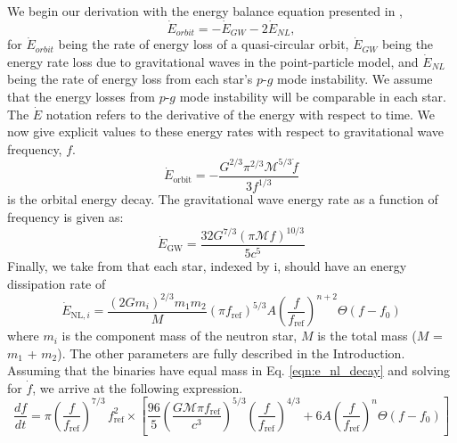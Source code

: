 We begin our derivation with the energy balance equation presented in \cite{Essick:2016tkn},
\begin{equation}\label{eqn_app:energy_bal}
\dot{E}_{orbit} = -\dot{E}_{GW} - 2 \dot{E}_{NL},
\end{equation}
for $\dot{E}_{orbit}$ being the rate of energy loss of a quasi-circular orbit, $\dot{E}_{GW}$ being the energy rate loss due to gravitational waves in the point-particle model, and $\dot{E}_{NL}$ being the rate of energy loss from each star's $p$-$g$ mode instability. We assume that the energy losses from $p$-$g$ mode instability will be comparable in each star. The $\dot{E}$ notation refers to the derivative of the energy with respect to time. We now give explicit values to these energy rates with respect to gravitational wave frequency, $f$.
\begin{equation}\label{eqn:e_orbit_decay}
\dot{E}_{\mathrm{orbit}} = - \frac{G^{2/3} \pi^{2/3} \mathcal{M}^{5/3} \dot{f}}{3 f^{1/3}}
\end{equation}
is the orbital energy decay. The gravitational wave energy rate as a function of frequency is given as:
\begin{equation}\label{eqn:e_gw_decay}
\dot{E}_{\mathrm{GW}} = \frac{32 G^{7/3} \left(\pi \mathcal{M} f\right)^{10/3}}{5 c^5}
\end{equation}
Finally, we take from \cite{Essick:2016tkn} that each star, indexed by i, should have an energy dissipation rate of
\begin{equation}\label{eqn:e_nl_decay}
\dot{E}_{\mathrm{NL}, i} = \frac{(2G m_i)^{2/3}m_1 m_2}{M} (\pi f_{\mathrm{ref}})^{5/3} A \left (\frac{f}{f_{\mathrm{ref}}} \right )^{n+2} \Theta(f - f_0) 
\end{equation}
where $m_i$ is the component mass of the neutron star, $M$ is the total mass ($M$ = $m_1$ + $m_2$). The other parameters are fully described in the Introduction. Assuming that the binaries have equal mass in Eq. \ref{eqn:e_nl_decay} and solving for $\dot{f}$, we arrive at the following expression.
\begin{equation}\label{eqn:f_dot}
\frac{df}{dt} =  \pi \left ( \frac{f}{f_{\mathrm{ref}}} \right )^{7/3} \, f_{\mathrm{ref}}^2 \times \left [ \frac{96}{5} \left ( \frac{G \mathcal{M} \pi f_{\mathrm{ref}}}{c^3}\right )^{5/3} \left (\frac{f}{f_{\mathrm{ref}}} \right )^{4/3} + 6 A \left (\frac{f}{f_{\mathrm{ref}}} \right )^{n} \Theta(f - f_0) \right ]
\end{equation}

